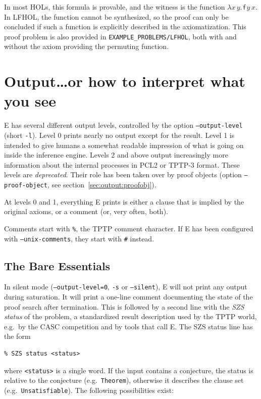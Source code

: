 \documentclass{report}
\begin{document}
In most HOLs, this formula is provable, and the witness is the
function $\lambda x \, y. \, \textsf{f} \, y \, x$. In LFHOL, the
function cannot be synthesized, so the proof can only be concluded if
such a function is explicitly described in the axiomatization.  This
proof problem is also provided in \texttt{EXAMPLE\_PROBLEMS/LFHOL},
both with and without the axiom providing the permuting function.


\chapter{Output\ldots or how to interpret what you see}
\label{sec:output}

E has several different output levels, controlled by the option
\texttt{--output-level}
(short \texttt{-l}). Level 0 prints nearly no
output except for the result. Level 1 is intended to give humans a
somewhat readable impression of what is going on inside the inference
engine. Levels 2 and above output increasingly more information about
the internal processes in PCL2 or TPTP-3 format. These
levels are \emph{deprecated}. Their role has been taken over by proof
objects (option \texttt{--proof-object}, see
section~\ref{sec:output:proofobj}).

At levels 0 and 1, everything E prints is either a clause that is
implied by the original axioms, or a comment (or, very often, both).

Comments start with \verb+%+, the TPTP comment character. If E has
been configured with \texttt{--unix-comments}, they start with
\verb+#+ instead.


\section{The Bare Essentials}
\label{sec:output:essentials}

In silent mode (\texttt{--output-level=0}, \texttt{-s} or
\texttt{--silent}), E will not print any output during saturation. It
will print a one-line comment documenting the state of the proof
search after termination. This is followed by a second line with the
\emph{SZS status} of the problem, a standardized result description
used by the TPTP world, e.g.\ by the CASC competition and by tools
that call E. The SZS status line has the form
\begin{verbatim}
% SZS status <status>
\end{verbatim}
where \texttt{<status>} is a single word. If the input contains a
conjecture, the status is relative to the conjecture (e.g.\
\texttt{Theorem}), otherwise it describes the clause set
(e.g.\ \texttt{Unsatisfiable}). The following possibilities exist:
\end{document}
